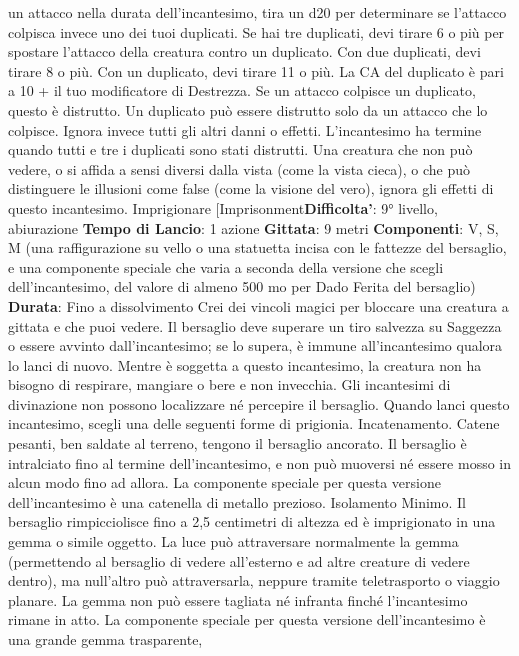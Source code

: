 \begin{multicols}{2}
un attacco nella durata dell’incantesimo, tira un d20 per
determinare se l’attacco colpisca invece uno dei tuoi
duplicati.
Se hai tre duplicati, devi tirare 6 o più per spostare
l’attacco della creatura contro un duplicato. Con due
duplicati, devi tirare 8 o più. Con un duplicato, devi
tirare 11 o più.
La CA del duplicato è pari a 10 + il tuo modificatore di
Destrezza. Se un attacco colpisce un duplicato, questo
è distrutto. Un duplicato può essere distrutto solo da un
attacco che lo colpisce. Ignora invece tutti gli altri danni
o effetti. L’incantesimo ha termine quando tutti e tre i
duplicati sono stati distrutti.
Una creatura che non può vedere, o si affida a sensi
diversi dalla vista (come la vista cieca), o che può 
distinguere le illusioni come false (come la visione del
vero), ignora gli effetti di questo incantesimo.
Imprigionare
[Imprisonment\textbf{Difficolta'}:
9° livello, abiurazione
\textbf{Tempo di Lancio}: 1 azione
\textbf{Gittata}: 9 metri
\textbf{Componenti}: V, S, M (una raffigurazione su vello o una
statuetta incisa con le fattezze del bersaglio, e una
componente speciale che varia a seconda della
versione che scegli dell’incantesimo, del valore di
almeno 500 mo per Dado Ferita del bersaglio)
\textbf{Durata}: Fino a dissolvimento
Crei dei vincoli magici per bloccare una creatura a
gittata e che puoi vedere. Il bersaglio deve superare un
tiro salvezza su Saggezza o essere avvinto
dall’incantesimo; se lo supera, è immune
all’incantesimo qualora lo lanci di nuovo. Mentre è
soggetta a questo incantesimo, la creatura non ha
bisogno di respirare, mangiare o bere e non invecchia.
Gli incantesimi di divinazione non possono localizzare
né percepire il bersaglio.
Quando lanci questo incantesimo, scegli una delle
seguenti forme di prigionia.
Incatenamento. Catene pesanti, ben saldate al
terreno, tengono il bersaglio ancorato. Il bersaglio è
intralciato fino al termine dell’incantesimo, e non può
muoversi né essere mosso in alcun modo fino ad allora.
La componente speciale per questa versione
dell’incantesimo è una catenella di metallo prezioso.
Isolamento Minimo. Il bersaglio rimpicciolisce fino a
2,5 centimetri di altezza ed è imprigionato in una
gemma o simile oggetto. La luce può attraversare
normalmente la gemma (permettendo al bersaglio di
vedere all’esterno e ad altre creature di vedere dentro),
ma null’altro può attraversarla, neppure tramite
teletrasporto o viaggio planare. La gemma non può
essere tagliata né infranta finché l’incantesimo rimane
in atto.
La componente speciale per questa versione
dell’incantesimo è una grande gemma trasparente,

\end{multicols}
